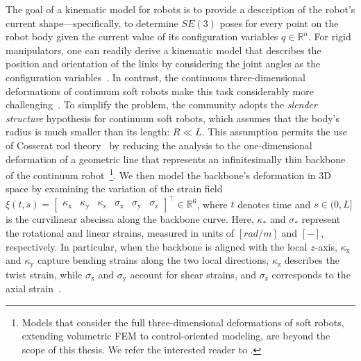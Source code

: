 The goal of a kinematic model for robots is to provide a description of the robot’s current shape—specifically, to determine $SE(3)$ poses for every point on the robot body given the current value of its configuration variables $q \in \mathbb{R}^{n}$.
For rigid manipulators, one can readily derive a kinematic model that describes the position and orientation of the links by considering the joint angles as the configuration variables~\citep{siciliano2010robotics}. In contrast, the continuous three-dimensional deformations of continuum soft robots make this task considerably more challenging~\citep{armanini2023soft}.
To simplify the problem, the community adopts the \emph{slender structure} hypothesis for continuum soft robots, which assumes that the body’s radius is much smaller than its length: $R \ll L$.
This assumption permits the use of Cosserat rod theory~\citep{cosserat1909theorie} by reducing the analysis to the one-dimensional deformation of a geometric line that represents an infinitesimally thin backbone of the continuum robot~\citep{gazzola2018forward}\footnote{Models that consider the full three-dimensional deformations of soft robots, extending volumetric \gls{FEM} to control-oriented modeling, are beyond the scope of this thesis. We refer the interested reader to \citet{faure2012sofa, coevoet2017software, armanini2023soft}.}.
We then model the backbone’s deformation in 3D space by examining the variation of the strain field $\xi(t,s) = \begin{bmatrix}
    \kappa_\mathrm{x} & \kappa_\mathrm{y} & \kappa_\mathrm{z} & \sigma_\mathrm{x} & \sigma_\mathrm{y} & \sigma_\mathrm{z}
\end{bmatrix}^\top \in \mathbb{R}^6$,
where $t$ denotes time and $s \in (0,L]$ is the curvilinear abscissa along the backbone curve. Here, $\kappa_*$ and $\sigma_*$ represent the rotational and linear strains, measured in units of $[\si{rad \per m}]$ and $[-]$, respectively. In particular, when the backbone is aligned with the local $z$-axis, $\kappa_\mathrm{x}$ and $\kappa_\mathrm{y}$ capture bending strains along the two local directions, $\kappa_\mathrm{z}$ describes the twist strain, while $\sigma_\mathrm{x}$ and $\sigma_\mathrm{y}$ account for shear strains, and $\sigma_\mathrm{z}$ corresponds to the axial strain~\citep{della2023model}.

